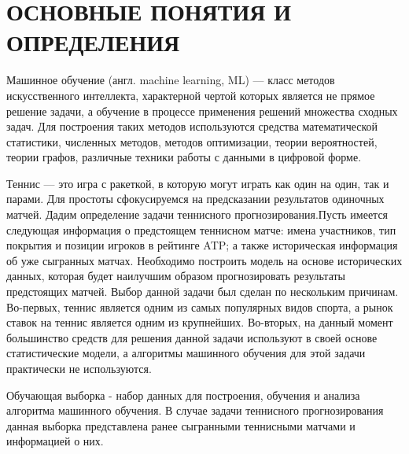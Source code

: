 \section*{ОСНОВНЫЕ ПОНЯТИЯ И ОПРЕДЕЛЕНИЯ}
Машинное обучение (англ. machine learning, ML) — класс методов искусственного интеллекта, характерной чертой которых является не прямое решение задачи, а обучение в процессе применения решений множества сходных задач. Для построения таких методов используются средства математической статистики, численных методов, методов оптимизации, теории вероятностей, теории графов, различные техники работы с данными в цифровой форме.

Теннис — это игра с ракеткой, в которую могут играть как один на один, так и парами. Для простоты сфокусируемся на предсказании результатов одиночных матчей. Дадим определение задачи теннисного прогнозирования.Пусть имеется следующая информация о предстоящем теннисном матче: имена участников, тип покрытия и позиции игроков в рейтинге ATP; а также историческая информация об уже сыгранных матчах. Необходимо построить модель на основе исторических данных, которая будет наилучшим образом прогнозировать результаты предстоящих матчей. Выбор данной задачи был сделан по нескольким причинам. Во-первых, теннис является одним из самых популярных видов спорта, а рынок ставок на теннис является одним из крупнейших. Во-вторых, на данный момент большинство средств для решения данной задачи используют в своей основе статистические модели, а алгоритмы машинного обучения для этой задачи практически не используются.

Обучающая выборка - набор данных для построения, обучения и анализа алгоритма машинного обучения. В случае задачи теннисного прогнозирования данная выборка представлена ранее сыгранными теннисными матчами и информацией о них.

